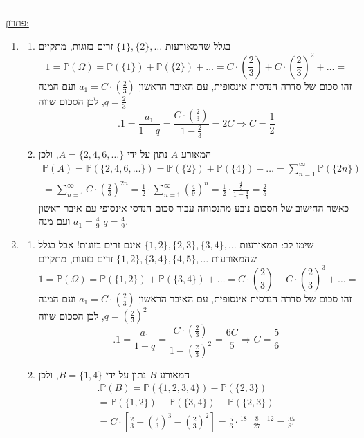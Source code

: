 \documentclass[12pt, a4paper]{article}
\newcommand{\PP}{\mathbb{P}}
\begin{document}
\begin{enumerate}
\noindent\rule{15cm}{0.4pt}

\underline{פתרון:}


\begin{enumerate}
\item
\begin{enumerate}
\item[(1)]
בגלל שהמאורעות
$\{1\},\{2\},\ldots$
זרים בזוגות,
מתקיים
$$1=\PP(\Omega)=\PP(\{1\})+\PP(\{2\})+\ldots
=C\cdot
\left(\frac{2}{3}\right)+
C\cdot
\left(\frac{2}{3}\right)^2+\ldots
=
$$
זהו סכום של סדרה הנדסית אינסופית, עם האיבר הראשון
$a_1=C\cdot\left(\frac{2}{3}\right)$
ועם המנה
$q=\frac{2}{3}$,
לכן הסכום שווה
$$.1=\frac{a_1}{1-q}
=\frac{C\cdot\left(\frac{2}{3}\right)}{1-\frac{2}{3}}
=2C
\Longrightarrow 
\boxed{C=\frac{1}{2}}$$
\item[(2)]
המאורע
$A$
 נתון על ידי
 $A=\{2,4,6,\ldots\}$,
 ולכן
\begin{multline*}
\boxed{\PP(A)}=
\PP(\{2,4,6,\ldots\})
=\PP(\{2\})+\PP(\{4\})+\ldots
=\sum_{n=1}^{\infty}
\PP(\{2n\})
\\=\sum_{n=1}^{\infty}
C\cdot
\left(
\frac{2}{3}\right)^{2n}
=\frac{1}{2}\cdot
\sum_{n=1}^{\infty}
\left(\frac{4}{9}\right)^n
=\frac{1}{2}\cdot
\frac{\frac{4}{9}}{1-\frac{4}{9}}
=\boxed{\frac{2}{5}}
\end{multline*}
כאשר החישוב של הסכום נובע מהנסוחה עבור סכום הנדסי אינסופי עם איבר ראשון
$a_1=\frac{4}{9}$
ועם מנה
$q=\frac{4}{9}$.
\end{enumerate}
\item
\begin{enumerate}
\item[(1)]
שימו לב: המאורעות
$\{1,2\},\{2,3\},\{3,4\},\ldots$
אינם זרים בזוגות! אבל
בגלל שהמאורעות
$\{1,2\},\{3,4\},\{4,5\},\ldots$
זרים בזוגות,
מתקיים
$$1=\PP(\Omega)=\PP(\{1,2\})+\PP(\{3,4\})+\ldots
=C\cdot
\left(\frac{2}{3}\right)+
C\cdot
\left(\frac{2}{3}\right)^3+\ldots
=
$$
זהו סכום של סדרה הנדסית אינסופית, עם האיבר הראשון
$a_1=C\cdot\left(\frac{2}{3}\right)$
ועם המנה
$q=\left(\frac{2}{3}\right)^2$,
לכן הסכום שווה
$$.1=\frac{a_1}{1-q}
=\frac{C\cdot\left(\frac{2}{3}\right)}{1-\left(\frac{2}{3}\right)^2}
=\frac{6C}{5}
\Longrightarrow 
\boxed{C=\frac{5}{6}}$$
\item[(2)]
המאורע
$B$
 נתון על ידי
 $B=\{1,4\}$,
 ולכן
\begin{multline*}
\boxed{.\PP(B)}=
\PP(\{1,2,3,4\})-\PP(\{2,3\})
\\=\PP(\{1,2\})+\PP(\{3,4\})-\PP(\{2,3\})
\\=C\cdot
\left[
\frac{2}{3}+\left(\frac{2}{3}\right)^3-\left(\frac{2}{3}\right)^2
\right]=\frac{5}{6}\cdot
\frac{18+8-12}{27}
=\boxed{\frac{35}{81}}
\end{multline*}
\end{enumerate}
\end{enumerate}


\end{enumerate}
\end{document}
